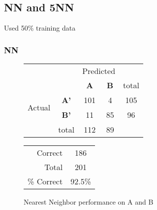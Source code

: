 \clearpage
\subsection{NN and 5NN}
Used 50\% training data

\subsubsection{NN}
\begin{figure}[ht]
\begin{minipage}[b]{0.5\linewidth}
\centering
	\begin{tabular}{ccc|c|c}
	 & &\multicolumn{2}{c}{Predicted} &\\
	  & & \bf{A} &  \bf{B} & total \\
	 \cline{3-5}
	 \multirow{2}{*}{\begin{sideways}Actual\end{sideways}} & \bf{A'}& 101 & 4 & 105 \\
	 \cline{3-5}
	 & \bf{B'}& 11 & 85 & 96 \\
	  \cline{3-5}
	 &total&112&89&\\
	\end{tabular}
\end{minipage}
\hspace{0.5cm}
\begin{minipage}[b]{0.5\linewidth}
	\begin{tabular}{r|c}
	\hline
	Correct& 186\\
	Total& 201\\
	\hline
	\% Correct& 92.5\%\\
	\hline
	\end{tabular}
\end{minipage}
\vspace{1mm}
\caption{Nearest Neighbor performance on A and B}
\end{figure}


